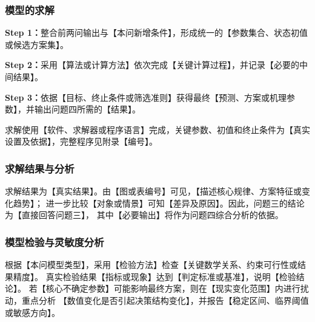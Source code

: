 \subsubsection{模型的求解}

\noindent\textbf{Step 1：}整合前两问输出与【本问新增条件】，形成统一的【参数集合、状态初值或候选方案集】。

\noindent\textbf{Step 2：}采用【算法或计算方法】依次完成【关键计算过程】，并记录【必要的中间结果】。

\noindent\textbf{Step 3：}依据【目标、终止条件或筛选准则】获得最终【预测、方案或机理参数】，并输出问题四所需的【结果】。

求解使用【软件、求解器或程序语言】完成，关键参数、初值和终止条件为【真实设置及依据】，完整程序见附录【编号】。

\subsubsection{求解结果与分析}

求解结果为【真实结果】。由【图或表编号】可见，【描述核心规律、方案特征或变化趋势】；
进一步比较【对象或情景】可知【差异及原因】。因此，问题三的结论为【直接回答问题三】，
其中【必要输出】将作为问题四综合分析的依据。

\subsubsection{模型检验与灵敏度分析}

根据【本问模型类型】，采用【检验方法】检查【关键数学关系、约束可行性或结果精度】。
真实检验结果【指标或现象】达到【判定标准或基准】，说明【检验结论】。
若【核心不确定参数】可能影响最终方案，则在【现实变化范围】内进行扰动，重点分析
【数值变化是否引起决策结构变化】，并报告【稳定区间、临界阈值或敏感方向】。
